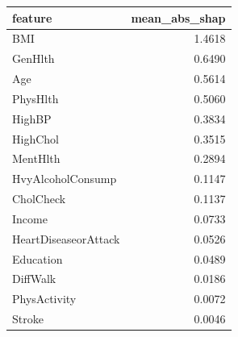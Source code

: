 \begin{tabular}{lr}
\toprule
feature & mean\_abs\_shap \\
\midrule
BMI & 1.4618 \\
GenHlth & 0.6490 \\
Age & 0.5614 \\
PhysHlth & 0.5060 \\
HighBP & 0.3834 \\
HighChol & 0.3515 \\
MentHlth & 0.2894 \\
HvyAlcoholConsump & 0.1147 \\
CholCheck & 0.1137 \\
Income & 0.0733 \\
HeartDiseaseorAttack & 0.0526 \\
Education & 0.0489 \\
DiffWalk & 0.0186 \\
PhysActivity & 0.0072 \\
Stroke & 0.0046 \\
\bottomrule
\end{tabular}
